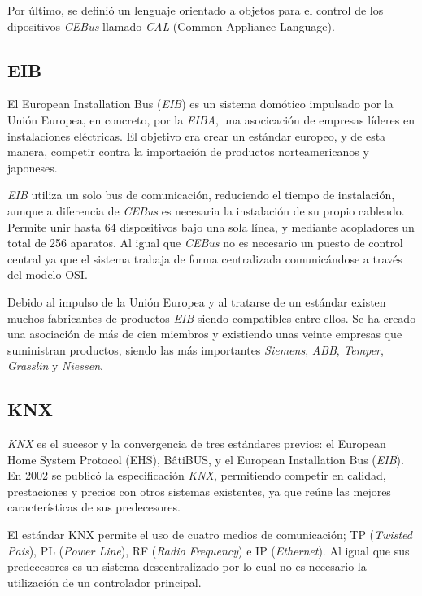 Por último, se definió un lenguaje orientado a objetos para el control de los dipositivos \emph{CEBus} llamado \emph{CAL} (Common Appliance Language).

\subsection{EIB}

El European Installation Bus (\emph{EIB}) es un sistema domótico impulsado por la Unión Europea, en concreto, por la \emph{EIBA}, una asocicación de empresas líderes en instalaciones eléctricas. El objetivo era crear un estándar europeo, y de esta manera, competir contra la importación de productos norteamericanos y japoneses.

\emph{EIB} utiliza un solo bus de comunicación, reduciendo el tiempo de instalación, aunque a diferencia de \emph{CEBus} es necesaria la instalación de su propio cableado. Permite unir hasta 64 dispositivos bajo una sola línea, y mediante acopladores un total de 256 aparatos. Al igual que \emph{CEBus} no es necesario un puesto de control central ya que el sistema trabaja de forma centralizada comunicándose a través del modelo OSI.

Debido al impulso de la Unión Europea y al tratarse de un estándar existen muchos fabricantes de productos \emph{EIB} siendo compatibles entre ellos. Se ha creado una asociación de más de cien miembros y existiendo unas veinte empresas que suministran productos, siendo las más importantes \emph{Siemens}, \emph{ABB}, \emph{Temper}, \emph{Grasslin} y \emph{Niessen}.

\subsection{KNX}

\emph{KNX} es el sucesor y la convergencia de tres estándares previos: el European Home System Protocol (EHS), BâtiBUS, y el European Installation Bus (\emph{EIB}). En 2002 se publicó la especificación \emph{KNX}, permitiendo competir en calidad, prestaciones y precios con otros sistemas existentes, ya que reúne las mejores características de sus predecesores.


El estándar KNX permite el uso de cuatro medios de comunicación; TP (\emph{Twisted Pais}), PL (\emph{Power Line}), RF (\emph{Radio Frequency}) e IP (\emph{Ethernet}). Al igual que sus predecesores es un sistema descentralizado por lo cual no es necesario la utilización de un controlador principal.